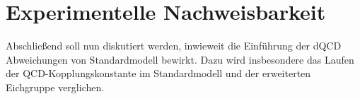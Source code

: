 \clearpage
\section{Experimentelle Nachweisbarkeit}

  Abschließend soll nun diskutiert werden, inwieweit die Einführung der dQCD 
  Abweichungen von Standardmodell bewirkt. Dazu wird insbesondere das Laufen 
  der QCD-Kopplungskonstante im Standardmodell und der erweiterten Eichgruppe 
  verglichen. 
